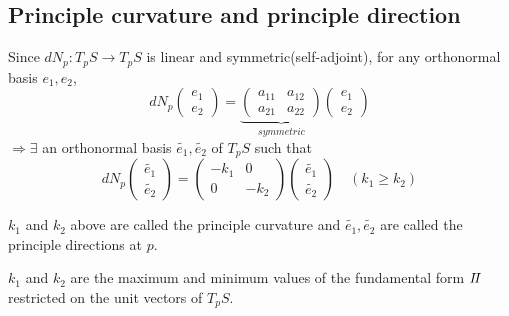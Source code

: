 \subsection{Principle curvature and principle direction}
Since \(d N_p\colon T_p S\to T_p S\) is linear and 
symmetric(self-adjoint), for any orthonormal basis {\(e_1,e_2\)},
\[
        d N_p\begin{pmatrix}
            e_1\\
            e_2
        \end{pmatrix}
        =\underbrace{\begin{pmatrix}
            a_{11}&a_{12}\\
            a_{21}&a_{22}
        \end{pmatrix}}_{symmetric}
        \begin{pmatrix}
            e_1\\
            e_2
        \end{pmatrix}
\]
\(\Rightarrow \exists\) an orthonormal basis {\(\tilde{e_1}
,\tilde{e_2}\)} of \(T_p S\) such that 
\[
        d N_p \begin{pmatrix}
            \tilde{e_1}\\
            \tilde{e_2}
        \end{pmatrix}
        =\begin{pmatrix}
            -k_1& 0\\
            0&-k_2
        \end{pmatrix}\begin{pmatrix}
            \tilde{e_1}\\
            \tilde{e_2}
        \end{pmatrix}
        \quad (k_1\ge k_2)
\]
\begin{definition}
    \(k_1\) and \(k_2\) above are called the principle curvature
    and \(\tilde{e_1},\tilde{e_2}\) are called the principle
    directions at \(p\).
\end{definition}
\begin{remark}
    \(k_1\) and \(k_2\) are the maximum and minimum values of 
    the  fundamental form \(I\!I\) restricted on 
    the unit vectors of \(T_p S\).
\end{remark}
